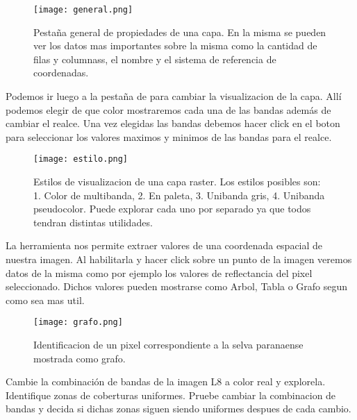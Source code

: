 \begin{figure}[h!]
\begin{center}
    \texttt{[image: general.png]}
\end{center}
\caption{Pestaña general de propiedades de una capa. En la misma se pueden ver
    los datos mas importantes sobre la misma como la cantidad de filas y
    columnass, el nombre y el sistema de referencia de coordenadas.}
\label{fig:general}
\end{figure}

Podemos ir luego a la pestaña de  para cambiar la visualizacion de
la capa. All\'i podemos elegir de que color mostraremos cada una de las
bandas adem\'as de cambiar el realce. Una vez elegidas las bandas debemos hacer
click en el boton  para seleccionar los valores maximos y minimos
de las bandas para el realce.

\begin{figure}[h!]
\begin{center}
    \texttt{[image: estilo.png]}
\end{center}
\caption{Estilos de visualizacion de una capa raster. Los estilos posibles son:
    1. Color de multibanda, 2. En paleta, 3. Unibanda gris, 4. Unibanda
    pseudocolor. Puede explorar cada uno por separado ya que todos tendran
    distintas utilidades.}
\label{fig:estilo}
\end{figure}

La herramienta  nos permite extraer valores
de una coordenada espacial de nuestra imagen. Al habilitarla y
hacer click sobre un punto de la imagen veremos datos de la misma como por
ejemplo los valores de reflectancia del pixel seleccionado. Dichos valores
pueden mostrarse como Arbol, Tabla o Grafo segun como sea mas util.

\begin{figure}[h!]
\begin{center}
    \texttt{[image: grafo.png]}
\end{center}
\caption{Identificacion de un pixel correspondiente a la selva paranaense
    mostrada como grafo. }
\label{fig:grafo}
\end{figure}

\begin{act}
    Cambie la combinación de bandas de la imagen L8 a color real y explorela.
    Identifique zonas de coberturas uniformes. Pruebe cambiar la
    combinacion de bandas y decida si dichas zonas siguen siendo uniformes
    despues de cada cambio.
\end{act}


